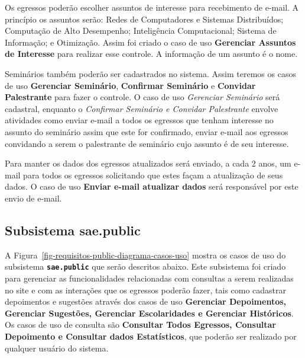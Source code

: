 Os egressos poderão escolher assuntos de interesse para recebimento de e-mail. A princípio os assuntos serão: Redes de Computadores e Sistemas Distribuídos; Computação de Alto Desempenho; Inteligência Computacional; Sistema de Informação; e Otimização. Assim foi criado o caso de uso \textbf{Gerenciar Assuntos de Interesse} para realizar esse controle. A informação de um assunto é o nome.


Seminários também poderão ser cadastrados no sistema. Assim teremos os casos de uso \textbf{Gerenciar Seminário}, \textbf{Confirmar Seminário} e \textbf{Convidar Palestrante} para fazer o controle. O caso de uso  \textit{Gerenciar Seminário} será cadastral, enquanto o  \textit{Confirmar Seminário e Convidar Palestrante} envolve atividades como enviar e-mail a todos os egressos que tenham interesse no assunto do seminário assim que este for confirmado, enviar e-mail aos egressos convidando a serem o palestrante de seminário cujo assunto é de seu interesse.

Para manter os dados dos egressos atualizados será enviado, a cada 2 anos, um e-mail para todos os egressos solicitando que estes façam a atualização de seus dados. O caso de uso \textbf{Enviar e-mail atualizar dados} será responsável por este envio de e-mail.
	
	
	






\subsection{Subsistema sae.public}
\label{sec-requisitos-casos-de-uso-public}
 

A Figura~\ref{fig-requisitos-public-diagrama-casos-uso} mostra os casos de uso do subsistema \textbf{\texttt{sae.public}} que serão descritos abaixo. Este subsistema foi criado para gerenciar as funcionalidades relacionadas com consultas a serem realizadas no site e com as interações que os egressos poderão fazer, tais como cadastrar depoimentos e sugestões através dos casos de uso \textbf{Gerenciar Depoimentos, Gerenciar Sugestões, Gerenciar Escolaridades e Gerenciar Históricos}. Os casos de uso de consulta são \textbf{Consultar Todos Egressos, Consultar Depoimento e Consultar dados Estatísticos}, que poderão ser realizado por qualquer usuário do sistema. 

